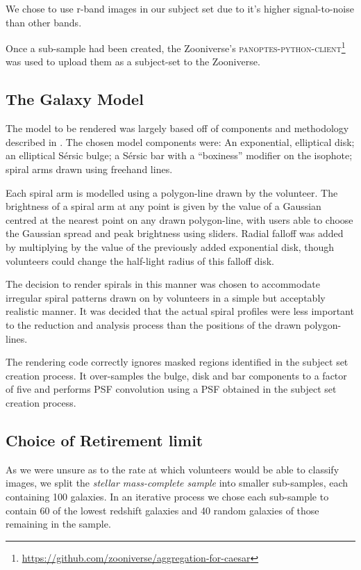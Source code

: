 \documentclass[../main.tex]{subfiles}
\begin{document}
We chose to use r-band images in our subject set due to it's higher signal-to-noise than other bands.

Once a sub-sample had been created, the Zooniverse's \textsc{panoptes-python-client}\footnote{\url{https://github.com/zooniverse/aggregation-for-caesar}} \citep{coleman_krawczyk_2019_2562861} was used to upload them as a subject-set to the Zooniverse.


\subsection{The Galaxy Model}
\label{section:galaxy-model}

The model to be rendered was largely based off of components and methodology described in \citet{galfit-paper}. The chosen model components were: An exponential, elliptical disk; an elliptical S\'ersic bulge; a S\'ersic bar with a ``boxiness'' modifier on the isophote; spiral arms drawn using freehand lines.

Each spiral arm is modelled using a polygon-line drawn by the volunteer. The brightness of a spiral arm at any point is given by the value of a Gaussian centred at the nearest point on any drawn polygon-line, with users able to choose the Gaussian spread and peak brightness using sliders. Radial falloff was added by multiplying by the value of the previously added exponential disk, though volunteers could change the half-light radius of this falloff disk.

The decision to render spirals in this manner was chosen to accommodate irregular spiral patterns drawn on by volunteers in a simple but acceptably realistic manner. It was decided that the actual spiral profiles were less important to the reduction and analysis process than the positions of the drawn polygon-lines.

The rendering code correctly ignores masked regions identified in the subject set creation process. It over-samples the bulge, disk and bar components to a factor of five and performs PSF convolution using a PSF obtained in the subject set creation process.

\subsection{Choice of Retirement limit}
\label{sec:retirement-limit}

As we were unsure as to the rate at which volunteers would be able to classify images, we split the \textit{stellar mass-complete sample} into smaller sub-samples, each containing 100 galaxies. In an iterative process we chose each sub-sample to contain 60 of the lowest redshift galaxies and 40 random galaxies of those remaining in the sample.
\end{document}

